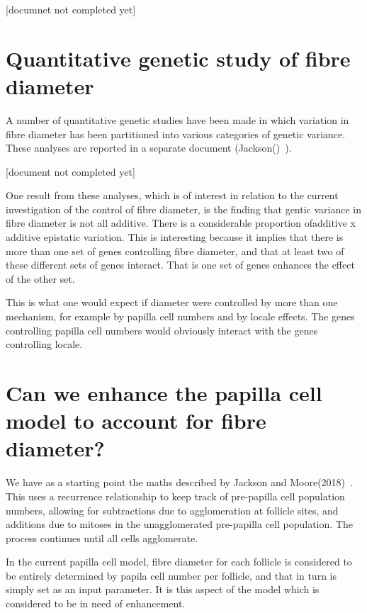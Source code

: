 \documentclass[titlepage]{article}  %
\begin{document}
[documnet not completed yet]


\section{Quantitative genetic study of fibre diameter}
A number of quantitative genetic studies have been made in which variation in fibre diameter has been partitioned into various categories of genetic variance.   These analyses are reported in a separate document (Jackson()~\cite{}).

[document not completed yet]

One result from these analyses, which is of interest in relation to the current investigation of the control of fibre diameter, is the finding that gentic variance in fibre diameter is not all additive. There is a considerable proportion ofadditive x additive epistatic variation. This is interesting because  it implies that there is more than one set of genes controlling fibre diameter, and that at least two of these different sets of genes interact. That is one set of genes enhances the effect of the other set.  

This is what one would expect if diameter were controlled by more than one mechanism, for example by papilla cell numbers and by locale effects. The genes controlling papilla cell numbers would obviously interact with the genes controlling locale.

\section{Can we enhance the papilla cell model to account for fibre diameter?}
We have as a starting point the maths described by Jackson and Moore(2018)~\cite{jack:18}. This uses a recurrence relationship to keep track of pre-papilla cell population numbers, allowing for subtractions due to agglomeration at follicle sites, and additions due to mitoses in the unagglomerated pre-papilla cell population. The process continues until all cells agglomerate.

 In the current papilla cell model, fibre diameter for each follicle is considered to be entirely determined by papila cell number per follicle, and that in turn is simply set as an input parameter. It is this aspect of the model which is considered to be in need of enhancement.
\end{document}
